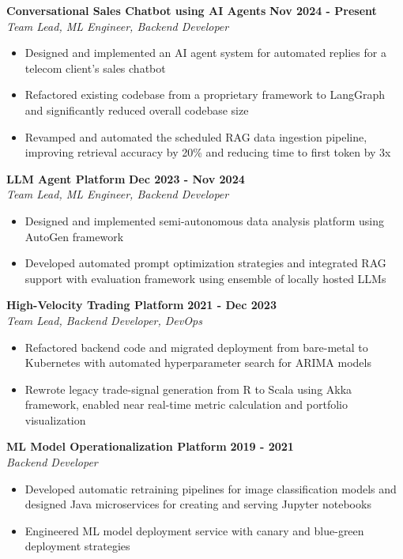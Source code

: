 \documentclass[11pt]{article}
\begin{document}
\textbf{Conversational Sales Chatbot using AI Agents} \hfill \textbf{Nov 2024 - Present} \\
\textit{Team Lead, ML Engineer, Backend Developer}
\begin{itemize}[leftmargin=*, nosep]
\item Designed and implemented an AI agent system for automated replies for a telecom client's sales chatbot
\item Refactored existing codebase from a proprietary framework to LangGraph and significantly reduced overall codebase size
\item Revamped and automated the scheduled RAG data ingestion pipeline, improving retrieval accuracy by 20\% and reducing time to first token by 3x
\end{itemize}

\textbf{LLM Agent Platform} \hfill \textbf{Dec 2023 - Nov 2024} \\
\textit{Team Lead, ML Engineer, Backend Developer}
\begin{itemize}[leftmargin=*, nosep]
\item Designed and implemented semi-autonomous data analysis platform using AutoGen framework
\item Developed automated prompt optimization strategies and integrated RAG support with evaluation framework using ensemble of locally hosted LLMs
\end{itemize}

\textbf{High-Velocity Trading Platform} \hfill \textbf{2021 - Dec 2023} \\
\textit{Team Lead, Backend Developer, DevOps}
\begin{itemize}[leftmargin=*, nosep]
\item Refactored backend code and migrated deployment from bare-metal to Kubernetes with automated hyperparameter search for ARIMA models
\item Rewrote legacy trade-signal generation from R to Scala using Akka framework, enabled near real-time metric calculation and portfolio visualization
\end{itemize}

\textbf{ML Model Operationalization Platform} \hfill \textbf{2019 - 2021} \\
\textit{Backend Developer}
\begin{itemize}[leftmargin=*, nosep]
\item Developed automatic retraining pipelines for image classification models and designed Java microservices for creating and serving Jupyter notebooks
\item Engineered ML model deployment service with canary and blue-green deployment strategies
\end{itemize}
\end{document}
